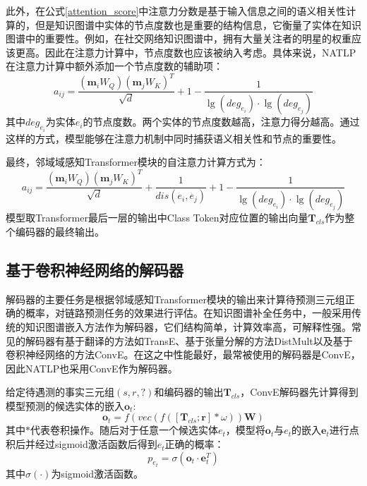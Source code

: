 此外，在公式\ref{attention_score}中注意力分数是基于输入信息之间的语义相关性计算的，但是知识图谱中实体的节点度数也是重要的结构信息，它衡量了实体在知识图谱中的重要性。例如，在社交网络知识图谱中，拥有大量关注者的明星的权重应该更高。因此在注意力计算中，节点度数也应该被纳入考虑。具体来说，NATLP在注意力计算中额外添加一个节点度数的辅助项：
\begin{equation}
  a_{ij}=\frac{(\boldsymbol{m}_iW_Q)(\boldsymbol{m}_jW_K)^T}{\sqrt{d}}+1-\frac{1}{\lg (deg_{e_i})\cdot \lg (deg_{e_j})}
\end{equation}
其中$deg_{e_i}$为实体$e_i$的节点度数。两个实体的节点度数越高，注意力得分越高。通过这样的方式，模型能够在注意力机制中同时捕获语义相关性和节点的重要性。

最终，邻域域感知Transformer模块的自注意力计算方式为：
\begin{equation}
  a_{ij}=\frac{(\boldsymbol{m}_iW_Q)(\boldsymbol{m}_jW_K)^T}{\sqrt{d}}+\frac{1}{dis(e_i,e_j)}+1-\frac{1}{\lg (deg_{e_i})\cdot \lg (deg_{e_j})}
\end{equation}
模型取Transformer最后一层的输出中Class Token对应位置的输出向量$\boldsymbol{T}_{cls}$作为整个编码器的最终输出。


\subsection{基于卷积神经网络的解码器}

解码器的主要任务是根据邻域感知Transformer模块的输出来计算待预测三元组正确的概率，对链路预测任务的效果进行评估。在知识图谱补全任务中，一般采用传统的知识图谱嵌入方法作为解码器，它们结构简单，计算效率高，可解释性强。常见的解码器有基于翻译的方法如TransE、基于张量分解的方法DistMult以及基于卷积神经网络的方法ConvE。在这之中性能最好，最常被使用的解码器是ConvE，因此NATLP也采用ConvE作为解码器。

给定待遇测的事实三元组$(s,r,?)$和编码器的输出$\boldsymbol{T}_{cls}$，ConvE解码器先计算得到模型预测的候选实体的嵌入$\boldsymbol{o}_{t}$:
\begin{equation}
  \boldsymbol{o}_{t}=f\left(vec\left(f\left(\left[\boldsymbol{T}_{cls};\boldsymbol{r}\right]\ast \omega\right)\right)\mathbf{W}\right)
\end{equation}
其中$\ast$代表卷积操作。随后对于任意一个候选实体$e_t$，模型将$\boldsymbol{o}_{t}$与$e_t$的嵌入$\boldsymbol{e}_{t}$进行点积后并经过sigmoid激活函数后得到$e_t$正确的概率：
\begin{equation}
  p_{e_t} = \sigma(\boldsymbol{o}_{t}\cdot \boldsymbol{e}_{t}^T)
\end{equation}
其中$\sigma(\cdot)$为sigmoid激活函数。

